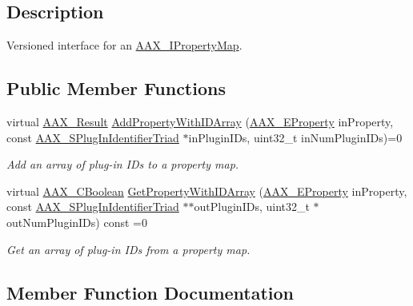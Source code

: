 \subsection{Description}
Versioned interface for an \hyperlink{a00112}{A\+A\+X\+\_\+\+I\+Property\+Map}. \subsection*{Public Member Functions}
\begin{DoxyCompactItemize}
\item 
virtual \hyperlink{a00149_a4d8f69a697df7f70c3a8e9b8ee130d2f}{A\+A\+X\+\_\+\+Result} \hyperlink{a00080_a364725ce288b0b5e4d0a98d2451b8878}{Add\+Property\+With\+I\+D\+Array} (\hyperlink{a00283_a6571f4e41a5dd06e4067249228e2249e}{A\+A\+X\+\_\+\+E\+Property} in\+Property, const \hyperlink{a00127}{A\+A\+X\+\_\+\+S\+Plug\+In\+Identifier\+Triad} $\ast$in\+Plugin\+I\+Ds, uint32\+\_\+t in\+Num\+Plugin\+I\+Ds)=0
\begin{DoxyCompactList}\small\item\em Add an array of plug-\/in I\+Ds to a property map. \end{DoxyCompactList}\item 
virtual \hyperlink{a00149_aa216506530f1d19a2965931ced2b274b}{A\+A\+X\+\_\+\+C\+Boolean} \hyperlink{a00080_a14d209356ee302cfb0d500cc7ee23764}{Get\+Property\+With\+I\+D\+Array} (\hyperlink{a00283_a6571f4e41a5dd06e4067249228e2249e}{A\+A\+X\+\_\+\+E\+Property} in\+Property, const \hyperlink{a00127}{A\+A\+X\+\_\+\+S\+Plug\+In\+Identifier\+Triad} $\ast$$\ast$out\+Plugin\+I\+Ds, uint32\+\_\+t $\ast$out\+Num\+Plugin\+I\+Ds) const =0
\begin{DoxyCompactList}\small\item\em Get an array of plug-\/in I\+Ds from a property map. \end{DoxyCompactList}\end{DoxyCompactItemize}


\subsection{Member Function Documentation}
\hypertarget{a00080_a364725ce288b0b5e4d0a98d2451b8878}{}
